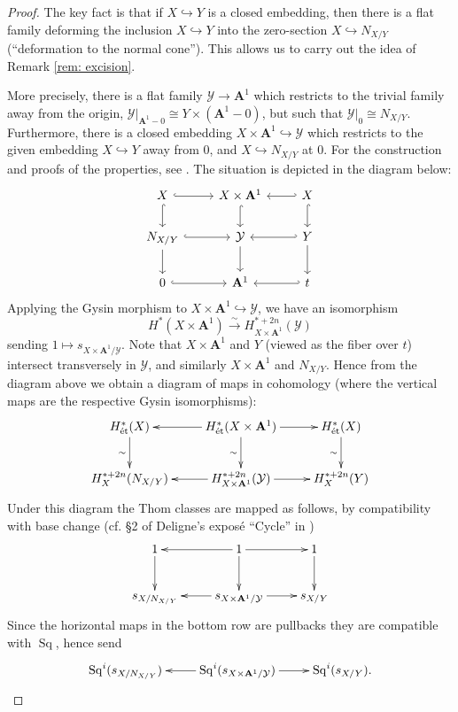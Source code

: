 \documentclass[10pt, reqno]{amsart}
\numberwithin{equation}{subsection}
\newcommand{\Cal}[1]{\mathcal{#1}}
\newcommand{\A}{\mathbf{A}}
\DeclareMathOperator{\et}{\acute{e}t}
\DeclareMathOperator{\Sq}{Sq}
\theoremstyle{remark}
\begin{document}
\begin{proof}
The key fact is that if $X \hookrightarrow Y$ is a closed embedding, then there is a flat family deforming the inclusion $X \hookrightarrow Y$ into the zero-section $X \hookrightarrow N_{X/Y}$ (``deformation to the normal cone''). This allows us to carry out the idea of Remark \ref{rem: excision}.

More precisely, there is a flat family $\Cal{Y} \rightarrow \A^1$ which restricts to the trivial family away from the origin, $\Cal{Y}|_{\A^1-0} \cong Y \times (\A^1-0)$, but such that $\Cal{Y}|_0 \cong N_{X/Y}$. Furthermore, there is a closed embedding $X \times \A^1 \hookrightarrow \Cal{Y}$ which restricts to the given embedding $X \hookrightarrow Y$ away from $0$, and $X \hookrightarrow N_{X/Y}$ at $0$. For the construction and proofs of the properties, see \cite[\S 5]{Ful98}. The situation is depicted in the diagram below: 
\[
\begin{tikzcd}
X \ar[d, hook] \ar[r, hook] & X \times \A^1 \ar[d, hook] & X \ar[l, hook'] \ar[d,hook] \\
N_{X/Y} \ar[d] \ar[r, hook] & \Cal{Y} \ar[d]  & Y \ar[l, hook'] \ar[d] \\
0 \ar[r, hook] & \A^1 & t \ar[l, hook'] 
\end{tikzcd}
\]
Applying the Gysin morphism to $X \times \A^1 \hookrightarrow \Cal{Y}$, we have an isomorphism
\[
H^*_{\et}(X \times \A^1 ) \xrightarrow{\sim} H^{*+2n}_{X\times \A^1}(\Cal{Y})
\]
sending $1 \mapsto s_{X \times \A^1/\Cal{Y}}$. Note that $X \times \A^1$ and $Y$ (viewed as the fiber over $t$) intersect transversely in $\Cal{Y}$, and similarly  $X \times \A^1$ and $N_{X/Y}$. Hence from the diagram above we obtain a diagram of maps in cohomology (where the vertical maps are the respective Gysin isomorphisms):
\[
\xymatrix{
H^*_{\et}(X) \ar[d]_{\sim} & \ar[l]  H^*_{\et}(X \times \A^1) \ar[d]_{\sim} \ar[r]  & H^*_{\et}(X) \ar[d]_{\sim} \\
H^{*+2n}_X (N_{X/Y} ) & \ar[l]  H^{*+2n}_{X\times \A^1}(\Cal{Y})  \ar[r] & H^{*+2n}_X(Y) 
}
\]
Under this diagram the Thom classes are mapped as follows, by compatibility with base change (cf. \S 2 of Deligne's expos\'{e} ``Cycle'' in \cite{SGA4_5})
\[
\xymatrix{
1 \ar[d] & \ar[l]  1 \ar[d] \ar[r]  & 1\ar[d] \\
s_{X/N_{X/Y}}  & \ar[l]  s_{X \times \A^1/\Cal{Y}}  \ar[r] & s_{X/Y}
}
\]
Since the horizontal maps in the bottom row are pullbacks they are compatible with $\Sq$, hence send
\[
\xymatrix{
\Sq^i (s_{X/N_{X/Y}})  \ar@{=} & \ar[l]  \Sq^i(s_{X \times \A^1/\Cal{Y}})  \ar[r]  \ar@{=} & \Sq^i(s_{X/Y}).  \ar@{=} \\
}\]
\end{proof}
\end{document}
